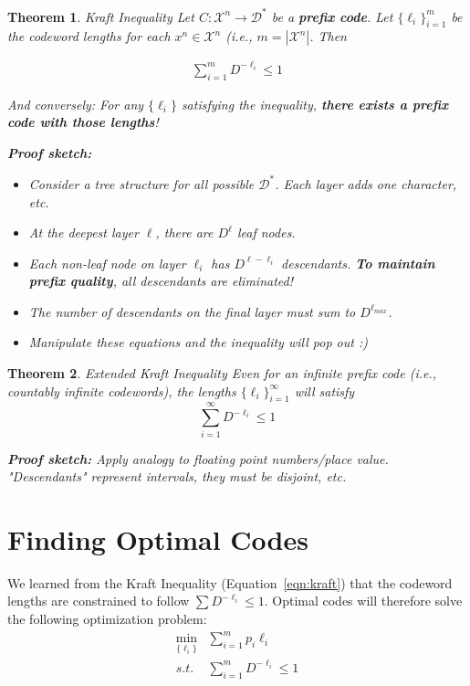 \documentclass[a4paper,12pt]{report}
\newtheorem{theorem}{Theorem}
\begin{document}
\begin{theorem}{Kraft Inequality}
Let $C:\mathcal X^n \to \mathcal D^*$ be a \textbf{prefix code}. Let
$\{\ell_i\}_{i=1}^m$ be the codeword lengths for each $x^n \in \mathcal X^n$
(i.e., $m = |\mathcal X^n|$. Then 

\begin{align}
	\label{eqn:kraft}
	\sum_{i=1}^{m} D^{-\ell_i} \leq 1
\end{align}

And conversely: For any $\{\ell_i\}$ satisfying the inequality, \textbf{there
exists a prefix code with those lengths}!

\textbf{Proof sketch:} 
\begin{itemize}
\item Consider a tree structure for all possible $\mathcal D^*$. Each layer adds
one character, etc. 
\item At the deepest layer $\ell$, there are $D^\ell$ leaf nodes.
\item Each non-leaf node on layer $\ell_i$ has $D^{\ell - \ell_i}$ descendants.
\textbf{To maintain prefix quality}, all descendants are eliminated!
\item The number of descendants on the final layer must sum to $D^{\ell_{max}}$. 
\item Manipulate these equations and the inequality will pop out :)
\end{itemize}
\end{theorem}


\begin{theorem}{Extended Kraft Inequality}
Even for an infinite prefix code (i.e., countably infinite codewords), the
lengths $\{\ell_i\}_{i=1}^\infty$ will satisfy 
\begin{equation}
	\sum_{i=1}^{\infty} D^{-\ell_i} \leq 1
\end{equation}

\textbf{Proof sketch:} Apply analogy to floating point numbers/place value.
"Descendants" represent intervals, they must be disjoint, etc. 
\end{theorem}



\section{Finding Optimal Codes}

We learned from the Kraft Inequality (Equation~\ref{eqn:kraft}) that the
codeword lengths are constrained to follow $\sum D^{-\ell_i} \leq 1$. Optimal
codes will therefore solve the following optimization problem:
\begin{align}
\min_{\{\ell_i\}} & \sum_{i=1}^{m} p_i \ell_i \\ 
s.t. & \sum_{i=1}^{m} D^{-\ell_i} \leq 1
\end{align}
\end{document}

